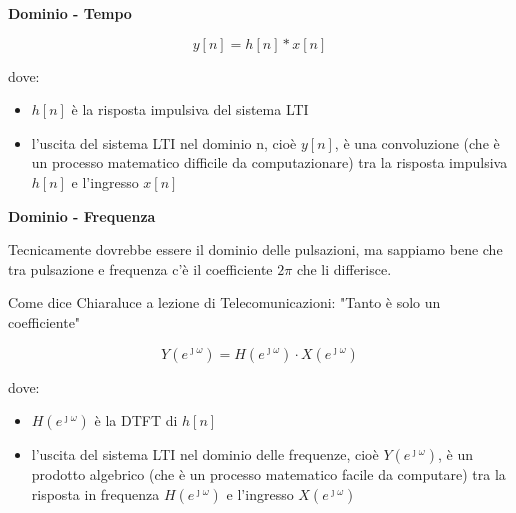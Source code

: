 \textbf{Dominio - Tempo} \newline 

{
    \Large 
    \begin{equation}
        y \left[ n\right]
        = 
        h \left[ n\right]
        * 
        x \left[ n\right]
    \end{equation}
}

dove: 

\begin{itemize}
    \item $h \left[ n\right]$ è la risposta impulsiva del sistema LTI 
    \item l'uscita del sistema LTI nel dominio n, cioè $y \left[ n\right]$, è una convoluzione (che è un processo matematico difficile da computazionare) tra la risposta impulsiva $h \left[ n\right]$ e l'ingresso $x \left[ n\right]$ \newline
\end{itemize} 

\textbf{Dominio - Frequenza} \newline 

\begin{tcolorbox}
    Tecnicamente dovrebbe essere il dominio delle pulsazioni, ma sappiamo bene che tra pulsazione e frequenza c'è il coefficiente $2 \pi$ che li differisce. \newline 

    Come dice Chiaraluce a lezione di Telecomunicazioni: "Tanto è solo un coefficiente"
\end{tcolorbox}

{
    \Large 
    \begin{equation}
        Y \left( e^{\jmath \omega}\right)
        = 
        H \left( e^{\jmath \omega}\right) 
        \cdot 
        X \left( e^{\jmath \omega}\right) 
    \end{equation}
} 

dove: 

\begin{itemize}
    \item $H \left( e^{\jmath \omega}\right)$ è la DTFT di $h \left[ n\right]$
    \item l'uscita del sistema LTI nel dominio delle frequenze, cioè $Y \left( e^{\jmath \omega}\right)$, è un prodotto algebrico (che è un processo matematico facile da computare) tra la risposta in frequenza $H \left( e^{\jmath \omega}\right)$ e l'ingresso $X \left( e^{\jmath \omega}\right)$ \newline
\end{itemize}

